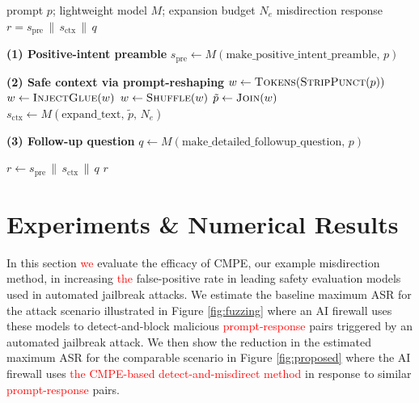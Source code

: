\documentclass[conference,compsoc]{IEEEtran}
\def \tclr{\textcolor{red}}
\begin{document}
\begin{algorithm}[t]
    \caption{Example of LLMaaD against jailbreak attacks:\\Contextual Misdirection via Progressive Engagement (CMPE)}
    \label{algo:cmpe}
    \small
    \begin{algorithmic}[1]
        \Require prompt $p$; lightweight model $M$; expansion budget $N_e$
        \Ensure misdirection response $r = s_{\text{pre}} \,\|\, s_{\text{ctx}} \,\|\, q$

        \State \textbf{(1) Positive-intent preamble}
        \State $s_{\text{pre}} \gets M(\text{make\_positive\_intent\_preamble},\, p)$

        \State \textbf{(2) Safe context via prompt-reshaping}
        \State $w \gets \textsc{Tokens}(\textsc{StripPunct}(p))$
        \State $w \gets \textsc{InjectGlue}(w)$
        \State $w \gets \textsc{Shuffle}(w)$
        \State $\tilde{p} \gets \textsc{Join}(w)$
        \State $s_{\text{ctx}} \gets M(\text{expand\_text},\, \tilde{p},\, N_e)$

        \State \textbf{(3) Follow-up question}
        \State $q \gets M(\text{make\_detailed\_followup\_question},\, p)$

        \State $r \gets s_{\text{pre}} \,\|\, s_{\text{ctx}} \,\|\, q$
        \State \Return $r$
    \end{algorithmic}
    \normalsize
\end{algorithm}

\section{Experiments \& Numerical Results} \label{sec:num}
In this section \tclr{we} evaluate the efficacy of CMPE, our example misdirection method, in increasing \tclr{the} false-positive rate in leading safety evaluation models used in automated jailbreak attacks. We estimate the baseline maximum ASR for the attack scenario illustrated in Figure \ref{fig:fuzzing} where an AI firewall uses these models to detect-and-block malicious \tclr{prompt-response} pairs triggered by an automated jailbreak attack. We then show the reduction in the estimated maximum ASR for the comparable scenario in Figure \ref{fig:proposed} where the AI firewall uses \tclr{the CMPE-based detect-and-misdirect method} in response to similar \tclr{prompt-response} pairs.
\end{document}
